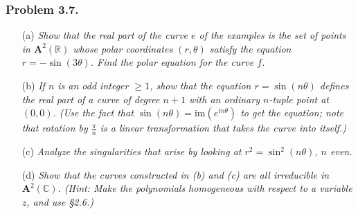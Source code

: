 \documentclass{article}
\begin{document}



\subsubsection*{Problem 3.7.}
\begin{enumerate}
\item[(a)]
  \emph{Show that the real part of the curve $e$ of the examples is
  the set of points in $\mathbf{A}^2(\mathbb{R})$ whose
  polar coordinates $(r,\theta)$ satisfy the equation $r = -\sin(3\theta)$.
  Find the polar equation for the curve $f$.}

\item[(b)]
  \emph{If $n$ is an odd integer $\geq 1$,
  show that the equation $r = \sin(n\theta)$ defines
  the real part of a curve of degree $n+1$ with an ordinary $n$-tuple point at $(0,0)$.
  (Use the fact that $\sin(n\theta) = \mathrm{im}(e^{in\theta})$ to get the equation;
  note that rotation by $\frac{\pi}{n}$ is a linear transformation that takes the curve into itself.)}

\item[(c)]
  \emph{Analyze the singularities that arise by looking at
  $r^2 = \sin^2(n\theta)$, $n$ even.}

\item[(d)]
  \emph{Show that the curves constructed in (b) and (c) are all irreducible in $\mathbf{A}^2(\mathbb{C})$.
  (Hint: Make the polynomials homogeneous with respect to a variable $z$, and use \S 2.6.)} \\
\end{enumerate}
\end{document}
